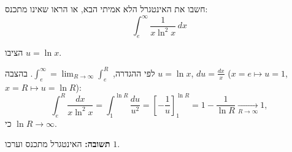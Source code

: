 
\begin{question}
חשבו את האינטגרל הלא אמיתי הבא, או הראו שאינו מתכנס:
\[ \int_e^\infty\frac{1}{x\ln^2 x}\,dx \]
\end{question}

\begin{hint}
הציבו $u = \ln x$.
\end{hint}

\begin{solution}
לפי ההגדרה, $\int_e^\infty = \lim_{R\to\infty}\int_e^R$. בהצבה $u = \ln x$, $du = \frac{dx}{x}$ ($x = e \mapsto u = 1$, $x = R\mapsto u = \ln R$):
\[ \int_e^R\frac{dx}{x\ln^2x} = \int_1^{\ln R}\frac{du}{u^2} = \left[-\frac1u\right]_1^{\ln R} = 1 - \frac{1}{\ln R} \xrightarrow[R\to\infty]{} 1, \]
כי $\ln R \to \infty$.

\textbf{תשובה:} האינטגרל מתכנס וערכו $1$.
\end{solution}
